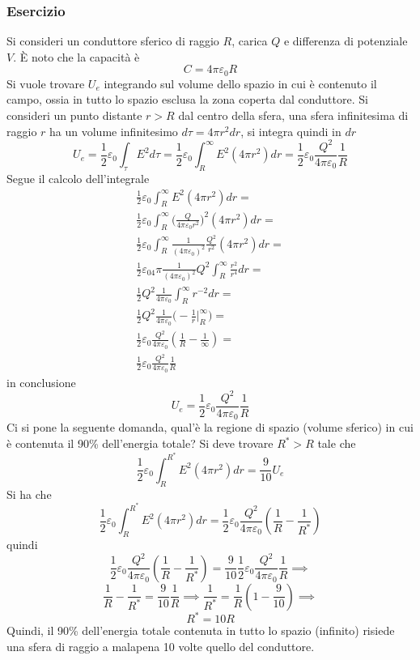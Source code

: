 \documentclass[10pt, letterpaper]{report}
\begin{document}
\subsubsection{Esercizio}
Si consideri un conduttore sferico di raggio $R$, carica $Q$ e differenza di potenziale $V$. È noto che la capacità è $$ C=4\pi\varepsilon_0R$$
Si vuole trovare $U_e$ integrando sul volume dello spazio in cui è contenuto il campo, ossia in tutto lo spazio esclusa la zona coperta dal conduttore.\acc 
Si consideri un punto distante $r>R$ dal centro della sfera, una sfera infinitesima di raggio $r$ ha un volume infinitesimo $d\tau=4\pi r^2dr$, si integra quindi in $dr$ 
$$ U_e=\frac{1}{2}\varepsilon_0\int_\tau E^2d\tau = \frac{1}{2}\varepsilon_0\int_R^\infty E^2(4\pi r^2)dr=\frac{1}{2}\varepsilon_0\frac{Q^2}{4\pi\varepsilon_0}\frac{1}{R}$$
Segue il calcolo dell'integrale
\begin{eqnarray}
    \frac{1}{2}\varepsilon_0\int_R^\infty E^2(4\pi r^2)dr=\\ 
    \frac{1}{2}\varepsilon_0\int_R^\infty \Big( \frac{Q}{4\pi\varepsilon_0r^2} \Big)^2(4\pi r^2)dr=\\ 
    \frac{1}{2}\varepsilon_0\int_R^\infty \frac{1}{(4\pi\varepsilon_0)^2}\frac{Q^2}{r^2}(4\pi r^2)dr=\\ 
   \frac{1}{2}\varepsilon_04\pi\frac{1}{(4\pi\varepsilon_0)^2}Q^2\int_R^\infty\frac{r^2}{r^4}dr=\\ 
   \frac{1}{2}Q^2\frac{1}{4\pi\varepsilon_0}\int_R^\infty r^{-2}dr = \\
   \frac{1}{2}Q^2\frac{1}{4\pi\varepsilon_0}\Big(-\frac{1}{r}\Bigg |_R^\infty\Big) = \\ 
   \frac{1}{2}\varepsilon_0\frac{Q^2}{4\pi\varepsilon_0}(\frac{1}{R}-\frac{1}{\infty})= \\
   \frac{1}{2}\varepsilon_0\frac{Q^2}{4\pi\varepsilon_0}\frac{1}{R}
\end{eqnarray}
in conclusione
$$U_e  =\frac{1}{2}\varepsilon_0\frac{Q^2}{4\pi\varepsilon_0}\frac{1}{R}$$
Ci si pone la seguente domanda, qual'è la regione di spazio (volume sferico) in cui è contenuta il 90\% dell'energia totale? Si deve trovare $R^*>R$ tale che 
$$ \frac{1}{2}\varepsilon_0\int_{R}^{R^*} E^2(4\pi r^2)dr=\frac{9}{10}U_e$$
Si ha che 
$$\frac{1}{2}\varepsilon_0\int_{R}^{R^*} E^2(4\pi r^2)dr=\frac{1}{2}\varepsilon_0\frac{Q^2}{4\pi\varepsilon_0}(\frac{1}{R}-\frac{1}{R^*}) $$
quindi 
$$ \frac{1}{2}\varepsilon_0\frac{Q^2}{4\pi\varepsilon_0}(\frac{1}{R}-\frac{1}{R^*}) =\frac{9}{10}
\frac{1}{2}\varepsilon_0\frac{Q^2}{4\pi\varepsilon_0}\frac{1}{R}\implies $$
$$ \frac{1}{R}-\frac{1}{R^*}=\frac{9}{10}\frac{1}{R}\implies \frac{1}{R^*}=\frac{1}{R}(1-\frac{9}{10})\implies$$
$$ R^*=10R$$
Quindi, il 90\% dell'energia totale contenuta in tutto lo spazio (infinito) risiede una sfera di raggio a malapena 10 volte quello del conduttore.
\end{document}
